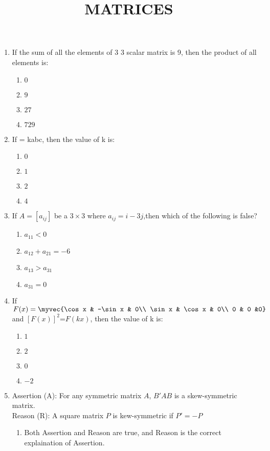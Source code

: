 \documentclass{article}
\begin{document}
\title{MATRICES}
\begin{enumerate}
\item If the sum of all the elements of $3$ 
\times $3$ scalar matrix is 9, then the product of all elements is:
\begin{enumerate}
		    \item $0$
		    \item $9$
		    \item $27$
		    \item $729$
	    \end{enumerate}
    \item If   = kabc, then the value of k is:
	    \begin{enumerate}
		    \item $0$
		    \item $1$
		    \item $2$
		    \item $4$
	    \end{enumerate}
    \item If $A=[a_{ij}]$ be a $3 \times 3$ where $a_{ij} = i - 3j$,then which of the following is false?
	    \begin{enumerate}
		    \item $a_{11}<0$
		    \item $a_{12} +a_{21} = -6$
		    \item $a_{13}>a_{31}$
		    \item $a_{31}=0$
	    \end{enumerate}
    \item If $F(x)= \myvec{\cos x & -\sin x & 0\\ \sin x & \cos x & 0\\ 0 & 0 &0}$ and $[F(x)]^2$=$F(kx)$, then the value of k is:
	    \begin{enumerate}
		    \item $1$
		    \item $2$
		    \item $0$
		    \item $-2$
	    \end{enumerate}
    \item Assertion (A): For any symmetric matrix $A$, $B'AB$ is a skew-symmetric matrix.\\
	  Reason (R): A square matrix $P$ is kew-symmetric if $P'=-P$
		\begin{enumerate}
			\item Both Assertion and Reason are true, and Reason is the correct explaination of Assertion.

\end{enumerate}
\end{enumerate}
\end{document}
